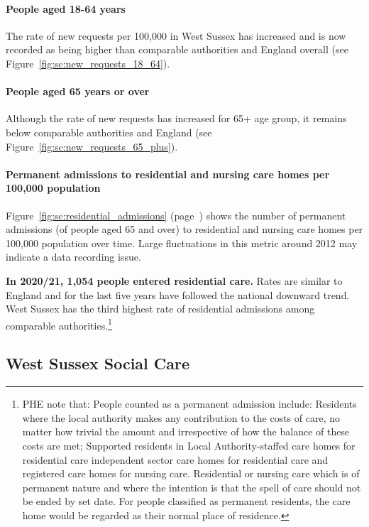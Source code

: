 \paragraph{People aged 18-64 years} The rate of new requests per 100,000 in West Sussex has increased and is now recorded as being higher than comparable authorities and England overall (see Figure~\ref{fig:sc:new_requests_18_64}).

\paragraph{People aged 65 years or over} Although the rate of new requests has increased for 65+ age group, it remains below comparable authorities and England (see Figure~\ref{fig:sc:new_requests_65_plus}).

\paragraph{Permanent admissions to residential and nursing care homes per 100,000 population} Figure~\ref{fig:sc:residential_admissions} (page~\pageref{fig:sc:residential_admissions}) shows the number of permanent admissions (of people aged 65 and over) to residential and nursing care homes per 100,000 population over time. Large fluctuations in this metric around 2012 may indicate a data recording issue.

{\bfseries In 2020/21, 1,054 people entered residential care.} Rates are similar to England and for the last five years have followed the national downward trend. West Sussex has the third highest rate of residential admissions among comparable authorities.\footnote{PHE note that: People counted as a permanent admission include: Residents where the local authority makes any contribution to the costs of care, no matter how trivial the amount and irrespective of how the balance of these costs are met; Supported residents in Local Authority-staffed care homes for residential care independent sector care homes for residential care and registered care homes for nursing care. Residential or nursing care which is of permanent nature and where the intention is that the spell of care should not be ended by set date. For people classified as permanent residents, the care home would be regarded as their normal place of residence.}

\subsection{West Sussex Social Care}
